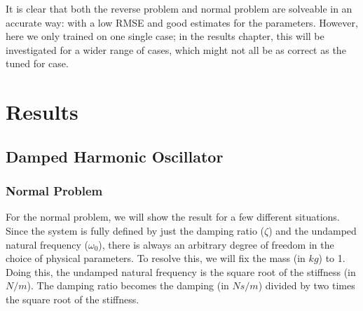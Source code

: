 \documentclass[12pt, a4paper]{report}
\begin{document}
It is clear that both the reverse problem and normal problem are solveable in an accurate way: with a low RMSE and good estimates for the parameters. However, here we only trained on one single case; in the results chapter, this will be investigated for a wider range of cases, which might not all be as correct as the tuned for case.
\chapter{Results}
\section{Damped Harmonic Oscillator}
\subsection{Normal Problem}
For the normal problem, we will show the result for a few different situations. Since the system is fully defined by just the damping ratio ($\zeta$) and the undamped natural frequency ($\omega_0$), there is always an arbitrary degree of freedom in the choice of physical parameters. To resolve this, we will fix the mass (in $kg$) to 1. Doing this, the undamped natural frequency is the square root of the stiffness (in $N/m$). The damping ratio becomes the damping (in $Ns/m$) divided by two times the square root of the stiffness.
\end{document}
